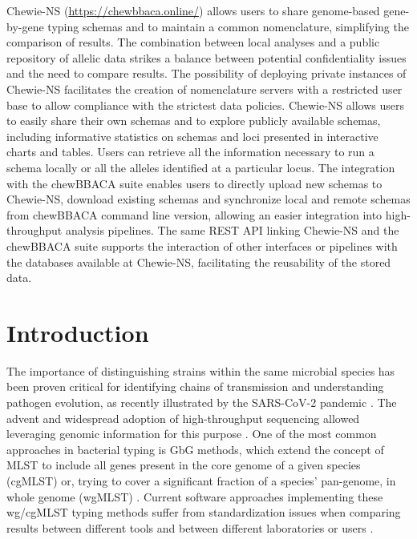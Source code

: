 \ac{Chewie-NS} (\url{https://chewbbaca.online/}) allows users to share genome-based gene-by-gene typing schemas and to maintain a common nomenclature, simplifying the comparison of results. The combination between local analyses and a public repository of allelic data strikes a balance between potential confidentiality issues and the need to compare results. The possibility of deploying private instances of \ac{Chewie-NS} facilitates the creation of nomenclature servers with a restricted user base to allow compliance with the strictest data policies. \ac{Chewie-NS} allows users to easily share their own schemas and to explore publicly available schemas, including informative statistics on schemas and loci presented in interactive charts and tables. Users can retrieve all the information necessary to run a schema locally or all the alleles identified at a particular locus. The integration with the chewBBACA suite enables users to directly upload new schemas to \ac{Chewie-NS}, download existing schemas and synchronize local and remote schemas from chewBBACA command line version, allowing an easier integration into high-throughput analysis pipelines. The same \ac{REST} \ac{API} linking \ac{Chewie-NS} and the chewBBACA suite supports the interaction of other interfaces or pipelines with the databases available at \ac{Chewie-NS}, facilitating the reusability of the stored data.

\section{Introduction} \label{sec:ch3_introduction}

The importance of distinguishing strains within the same microbial species has been proven critical for identifying chains of transmission and understanding pathogen evolution, as recently illustrated by the SARS-CoV-2 pandemic \cite{black_ten_2020, deng_genomic_2020}. The advent and widespread adoption of high-throughput sequencing allowed leveraging genomic information for this purpose \cite{black_ten_2020, deng_genomic_2020}. One of the most common approaches in bacterial typing is \ac{GbG} methods, which extend the concept of \ac{MLST} to include all genes present in the core genome of a given species (\ac{cgMLST}) or, trying to cover a significant fraction of a species’ pan-genome, in whole genome (\ac{wgMLST}) \cite{maiden_mlst_2013}. Current software approaches implementing these \ac{wg/cgMLST} typing methods suffer from standardization issues when comparing results between different tools and between different laboratories or users \cite{uelze_typing_2020}.

